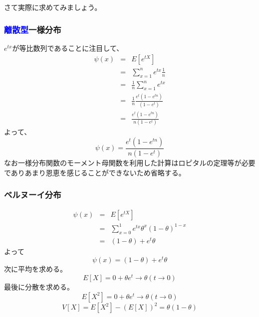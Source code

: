 \documentclass[a4paper,10pt]{jarticle}
\begin{document}
さて実際に求めてみましょう。
\subsubsection{\textcolor{blue}{離散型}一様分布}
$e^{tx}$が等比数列であることに注目して、
\begin{eqnarray*}
    \psi(x) &=& E[e^{tX}] \\
    &=& \sum_{x=1}^n e^{tx}\frac{1}{n}\\
    &=& \frac{1}{n}\sum_{x=1}^n e^{tx}\\
    &=& \frac{1}{n}\frac{e^t(1-e^{tn})}{(1-e^t)}\\
    &=& \frac{e^t(1-e^{tn})}{n(1-e^t)}
\end{eqnarray*}
よって、
\begin{equation}
    \psi(x) = \frac{e^t(1-e^{tn})}{n(1-e^t)}\tag{3,22}
\end{equation}
なお一様分布関数のモーメント母関数を利用した計算はロピタルの定理等が必要でありあまり恩恵を感じることができないため省略する。
\subsubsection{ベルヌーイ分布}
\begin{eqnarray*}
    \psi(x) &=& E[e^{tX}] \\
    &=& \sum_{x=0}^1 e^{tx}\theta^x (1-\theta)^{1-x}\\
    &=&(1-\theta)+e^t\theta
\end{eqnarray*}
よって
\begin{equation}
    \psi(x) = (1-\theta)+e^t\theta\tag{3,23}
\end{equation}
次に平均を求める。
\begin{equation}
    E[X] = 0+\theta e^t\rightarrow \theta(t\rightarrow 0)\tag{3,24}
\end{equation}
最後に分散を求める。
\begin{equation}
    E[X^2] = 0+\theta e^t\rightarrow \theta(t\rightarrow 0)\tag{3,25}
\end{equation}
\begin{equation}
    V[X] = E[X^2]-(E[X])^2 = \theta (1-\theta)\tag{3,26}
\end{equation}
\end{document}
